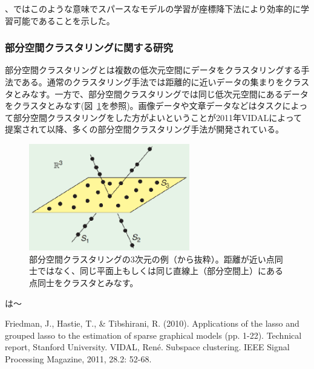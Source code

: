 \cite{HSM01}、\cite{HSM02}ではこのような意味でスパースなモデルの学習が座標降下法により効率的に学習可能であることを示した。


\subsubsection{部分空間クラスタリングに関する研究}

部分空間クラスタリングとは複数の低次元空間にデータをクラスタリングする手法である。通常のクラスタリング手法では距離的に近いデータの集まりをクラスタとみなす。一方で、部分空間クラスタリングでは同じ低次元空間にあるデータをクラスタとみなす(図~\ref{fig:my_label}を参照)。画像データや文章データなどはタスクによって部分空間クラスタリングをした方がよいということが2011年VIDAL\cite{SC}によって提案されて以降、多くの部分空間クラスタリング手法が開発されている。

\begin{figure}[h]
    \centering
    \includegraphics[width=7cm]{Matsushima/sc.eps}
    \caption{部分空間クラスタリングの3次元の例（\cite{SC}から抜粋）。距離が近い点同士ではなく、同じ平面上もしくは同じ直線上（部分空間上）にある点同士をクラスタとみなす。}
    \label{fig:my_label}
\end{figure}
\cite{NM01}は〜

\begin{thebibliography}{9}
    Friedman, J., Hastie, T., & Tibshirani, R. (2010). 
    Applications of the lasso and grouped lasso to the estimation of sparse graphical models (pp. 1-22). Technical report, Stanford University.
 VIDAL, René. Subspace clustering. IEEE Signal Processing Magazine, 2011, 28.2: 52-68.
\end{thebibliography}

